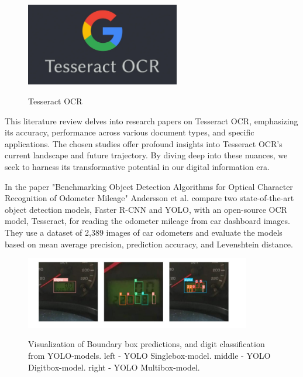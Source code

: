 \begin{figure}[ht]
    \centering
    \includegraphics[width=0.6\textwidth]{Figures/tesseract_ocr.jpg}
    \caption[Tesseract OCR]{Tesseract OCR}\cite{liTrOCRTransformerBasedOptical2023}
    \label{fig:Tesseract OCR}
\end{figure}


This literature review delves into research papers on Tesseract OCR, emphasizing its accuracy, performance across various document types, and specific applications. The chosen studies offer profound insights into Tesseract OCR's current landscape and future trajectory. By diving deep into these nuances, we seek to harness its transformative potential in our digital information era.

In the paper "Benchmarking Object Detection Algorithms for Optical Character Recognition of Odometer Mileage" Andersson et al. compare two state-of-the-art object detection models, Faster R-CNN and YOLO, with an open-source OCR model, Tesseract, for reading the odometer mileage from car dashboard images. They use a dataset of 2,389 images of car odometers and evaluate the models based on mean average precision, prediction accuracy, and Levenshtein distance.

\begin{figure}[ht]
    \centering
    \includegraphics[width=0.88\textwidth]{Figures/tesseract_papers/Andersson_2022.jpg}
    \caption[Visualization of Boundary box predictions, and digit classification from
        YOLO-models. left - YOLO Singlebox-model. middle - YOLO Digitbox-model. right - YOLO
        Multibox-model.]{Visualization of Boundary box predictions, and digit classification from
        YOLO-models. left - YOLO Singlebox-model. middle - YOLO Digitbox-model. right - YOLO
        Multibox-model.}\cite{anderssonBenchmarkingObjectDetection2022}
    \label{fig:Andersson Visualisation of Boundary box predictions}
\end{figure}


